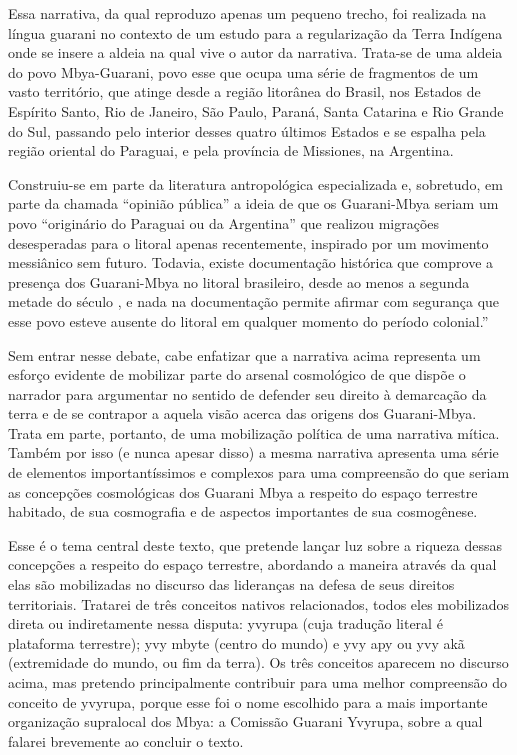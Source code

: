 \bigskip
\bigskip
Essa narrativa, da qual reproduzo apenas um pequeno trecho, foi
realizada na língua guarani no contexto de um estudo para a
regularização da Terra Indígena onde se insere a aldeia na qual vive o
autor da narrativa. Trata-se de uma aldeia do povo Mbya-Guarani, povo
esse que ocupa uma série de fragmentos de um vasto território, que
atinge desde a região litorânea do Brasil, nos Estados de Espírito
Santo, Rio de Janeiro, São Paulo, Paraná, Santa Catarina e Rio Grande
do Sul, passando pelo interior desses quatro últimos Estados e se
espalha pela região oriental do Paraguai, e pela província de
Missiones, na Argentina.

Construiu-se em parte da literatura antropológica especializada e,
sobretudo, em parte da chamada ``opinião pública'' a ideia de que os
Guarani-Mbya seriam um povo ``originário do Paraguai ou da Argentina''
que realizou migrações desesperadas para o litoral apenas recentemente,
inspirado por um movimento messiânico sem futuro. Todavia, existe
documentação histórica que comprove a presença dos Guarani-Mbya no
litoral brasileiro, desde ao menos a segunda metade do século , e
nada na documentação permite afirmar com segurança que esse povo esteve
ausente do litoral em qualquer momento do período colonial.''

Sem entrar nesse debate, cabe enfatizar que a narrativa acima representa
um esforço evidente de mobilizar parte do arsenal cosmológico de que
dispõe o narrador para argumentar no sentido de defender seu direito à
demarcação da terra e de se contrapor a aquela visão acerca das origens
dos Guarani-Mbya. Trata em parte, portanto, de uma mobilização política
de uma narrativa mítica. Também por isso (e nunca apesar disso) a mesma
narrativa apresenta uma série de elementos importantíssimos e complexos
para uma compreensão do que seriam as concepções cosmológicas dos
Guarani Mbya a respeito do espaço terrestre habitado, de sua
cosmografia e de aspectos importantes de sua cosmogênese.

Esse é o tema central deste texto, que pretende lançar luz sobre a
riqueza dessas concepções a respeito do  espaço terrestre,  abordando a
maneira através da qual elas são mobilizadas no discurso das lideranças
na defesa de seus direitos territoriais. Tratarei de três conceitos
nativos relacionados, todos eles mobilizados direta ou indiretamente
nessa disputa: yvyrupa (cuja tradução literal é plataforma terrestre);
yvy mbyte (centro do mundo) e yvy apy ou yvy akã (extremidade do mundo,
ou fim da terra). Os três conceitos aparecem no discurso acima, mas
pretendo principalmente contribuir para uma melhor compreensão do
conceito de yvyrupa, porque esse foi o nome escolhido para a mais
importante organização supralocal dos Mbya: a Comissão Guarani Yvyrupa,
sobre a qual falarei brevemente ao concluir o texto.

